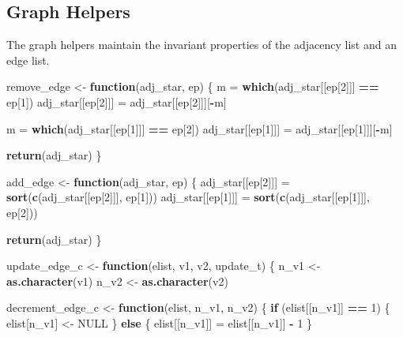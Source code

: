 \documentclass[11pt,a4paper]{article}
\newenvironment{Shaded}{\begin{snugshade}}{\end{snugshade}}
\newcommand{\ControlFlowTok}[1]{\textcolor[rgb]{0.13,0.29,0.53}{\textbf{#1}}}
\newcommand{\DecValTok}[1]{\textcolor[rgb]{0.00,0.00,0.81}{#1}}
\newcommand{\KeywordTok}[1]{\textcolor[rgb]{0.13,0.29,0.53}{\textbf{#1}}}
\newcommand{\NormalTok}[1]{#1}
\newcommand{\OperatorTok}[1]{\textcolor[rgb]{0.81,0.36,0.00}{\textbf{#1}}}
\newcommand{\OtherTok}[1]{\textcolor[rgb]{0.56,0.35,0.01}{#1}}
\newcommand{\StringTok}[1]{\textcolor[rgb]{0.31,0.60,0.02}{#1}}
\begin{document}
\hypertarget{graph-helpers}{%
\subsection{Graph Helpers}\label{graph-helpers}}

The graph helpers maintain the invariant properties of the adjacency
list and an edge list.

\begin{Shaded}
\begin{Highlighting}[]
\NormalTok{remove_edge <-}\StringTok{ }\ControlFlowTok{function}\NormalTok{(adj_star, ep) \{}
\NormalTok{  m =}\StringTok{ }\KeywordTok{which}\NormalTok{(adj_star[[ep[}\DecValTok{2}\NormalTok{]]] }\OperatorTok{==}\StringTok{ }\NormalTok{ep[}\DecValTok{1}\NormalTok{])}
\NormalTok{  adj_star[[ep[}\DecValTok{2}\NormalTok{]]] =}\StringTok{ }\NormalTok{adj_star[[ep[}\DecValTok{2}\NormalTok{]]][}\OperatorTok{-}\NormalTok{m]}
  
\NormalTok{  m =}\StringTok{ }\KeywordTok{which}\NormalTok{(adj_star[[ep[}\DecValTok{1}\NormalTok{]]] }\OperatorTok{==}\StringTok{ }\NormalTok{ep[}\DecValTok{2}\NormalTok{])}
\NormalTok{  adj_star[[ep[}\DecValTok{1}\NormalTok{]]] =}\StringTok{ }\NormalTok{adj_star[[ep[}\DecValTok{1}\NormalTok{]]][}\OperatorTok{-}\NormalTok{m]}
  
  \KeywordTok{return}\NormalTok{(adj_star)}
\NormalTok{\}}

\NormalTok{add_edge <-}\StringTok{ }\ControlFlowTok{function}\NormalTok{(adj_star, ep) \{}
\NormalTok{  adj_star[[ep[}\DecValTok{2}\NormalTok{]]] =}\StringTok{ }\KeywordTok{sort}\NormalTok{(}\KeywordTok{c}\NormalTok{(adj_star[[ep[}\DecValTok{2}\NormalTok{]]], ep[}\DecValTok{1}\NormalTok{]))}
\NormalTok{  adj_star[[ep[}\DecValTok{1}\NormalTok{]]] =}\StringTok{ }\KeywordTok{sort}\NormalTok{(}\KeywordTok{c}\NormalTok{(adj_star[[ep[}\DecValTok{1}\NormalTok{]]], ep[}\DecValTok{2}\NormalTok{]))}
  
  \KeywordTok{return}\NormalTok{(adj_star)}
\NormalTok{\}}

\NormalTok{update_edge_c <-}\StringTok{ }\ControlFlowTok{function}\NormalTok{(elist, v1, v2, update_t) \{}
\NormalTok{  n_v1 <-}\StringTok{ }\KeywordTok{as.character}\NormalTok{(v1)}
\NormalTok{  n_v2 <-}\StringTok{ }\KeywordTok{as.character}\NormalTok{(v2)}
  
\NormalTok{  decrement_edge_c <-}\StringTok{ }\ControlFlowTok{function}\NormalTok{(elist, n_v1, n_v2) \{}
    \ControlFlowTok{if}\NormalTok{ (elist[[n_v1]] }\OperatorTok{==}\StringTok{ }\DecValTok{1}\NormalTok{) \{}
\NormalTok{      elist[n_v1] <-}\StringTok{ }\OtherTok{NULL}
\NormalTok{    \} }\ControlFlowTok{else}\NormalTok{ \{}
\NormalTok{      elist[[n_v1]] =}\StringTok{ }\NormalTok{elist[[n_v1]] }\OperatorTok{-}\StringTok{ }\DecValTok{1}
\NormalTok{    \}}
    

\end{Highlighting}
\end{Shaded}
\end{document}
